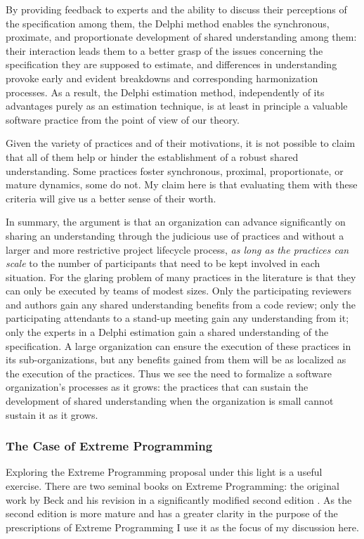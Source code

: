 By providing feedback to experts and the ability to discuss their perceptions of the specification among them, the Delphi method enables the synchronous, proximate, and proportionate development of shared understanding among them: their interaction leads them to a better grasp of the issues concerning the specification they are supposed to estimate, and differences in understanding provoke early and evident breakdowns and corresponding harmonization processes. As a result, the Delphi estimation method, independently of its advantages purely as an estimation technique, is at least in principle a valuable software practice from the point of view of our theory.

Given the variety of practices and of their motivations, it is not possible to claim that all of them help or hinder the establishment of a robust shared understanding. Some practices foster synchronous, proximal, proportionate, or mature dynamics, some do not. My claim here is that evaluating them with these criteria will give us a better sense of their worth.

In summary, the argument is that an organization can advance significantly on sharing an understanding through the judicious use of practices and without a larger and more restrictive project lifecycle process, \emph{as long as the practices can scale} to the number of participants that need to be kept involved in each situation. For the glaring problem of many practices in the literature is that they can only be executed by teams of modest sizes. Only the participating reviewers and authors gain any shared understanding benefits from a code review; only the participating attendants to a stand-up meeting gain any understanding from it; only the experts in a Delphi estimation gain a shared understanding of the specification. A large organization can ensure the execution of these practices in its sub-organizations, but any benefits gained from them will be as localized as the execution of the practices. Thus we see the need to formalize a software organization's processes as it grows: the practices that can sustain the development of shared understanding when the organization is small cannot sustain it as it grows.


\subsubsection{The Case of Extreme Programming}
\label{sec:Extreme}

Exploring the Extreme Programming proposal under this light is a useful exercise. There are two seminal books on Extreme Programming: the original work by Beck  and his revision in a significantly modified second edition \cite{Beck2005}. As the second edition is more mature and has a greater clarity in the purpose of the prescriptions of Extreme Programming I use it as the focus of my discussion here.

